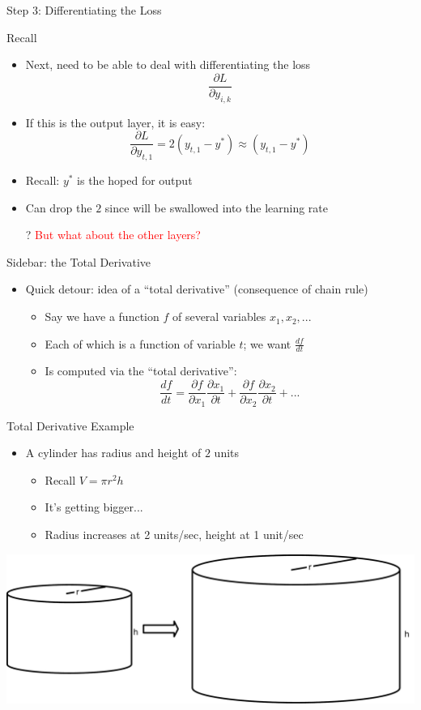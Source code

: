 \documentclass[aspectratio=169]{beamer}
\begin{document}
\begin{frame}{Step 3: Differentiating the Loss}

Recall
\begin{itemize}
	\item Next, need to be able to deal with differentiating the loss
		$$\frac{\partial L}{\partial y_{i,k}}$$
	\item If this is the output layer, it is easy:
	$$\frac{\partial L}{\partial y_{t,1}} = 2 (y_{t,1} - y^{*}) \approx (y_{t,1} - y^{*})$$
	\item Recall: $y^*$ is the hoped for output
	\item Can drop the $2$ since will be swallowed into the learning rate
	\item[?] \textcolor{red}{But what about the other layers?}
\end{itemize}
\end{frame}
\begin{frame}{Sidebar: the Total Derivative}

\begin{itemize}
	\item Quick detour: idea of a ``total derivative'' (consequence of chain rule)
	\begin{itemize}
		\item Say we have a function $f$ of several variables $x_1, x_2, ...$
		\item Each of which is a function of variable $t$; we want $\frac{df}{dt}$
		\item Is computed via the ``total derivative'':
		$$\frac{df}{dt} = \frac{\partial f}{\partial x_1} \frac{\partial x_1}{\partial t} + 
			 \frac{\partial f}{\partial x_2} \frac{\partial x_2}{\partial t} + ...$$
	\end{itemize}
\end{itemize}
\end{frame}
\begin{frame}{Total Derivative Example}

\begin{itemize}
	\item A cylinder has radius and height of $2$ units 
	\begin{itemize}
		\item Recall $V = \pi r^2 h$
		\item It's getting bigger...
		\item Radius increases at 2 units/sec, height at 1 unit/sec
	\end{itemize}
\end{itemize}
\begin{center}
\includegraphics[width=.75\textwidth]{lectBP/cyl.pdf}
\end{center}
\end{frame}
\end{document}

